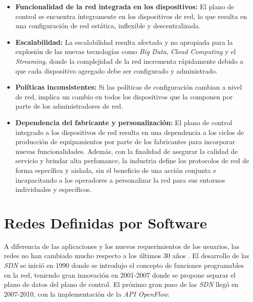 \begin{itemize}
	\item \textbf{Funcionalidad de la red integrada en los dispositivos:} El plano de control se encuentra íntegramente en los dispositivos de red, lo que resulta en una configuración de red estática, inflexible y descentralizada. 
	\item \textbf{Escalabilidad:} La escalabilidad resulta afectada y no apropiada para la explosión de las nuevas tecnologías como \textit{Big Data}, \textit{Cloud Computing} y el \textit{Streaming}, donde la complejidad de la red incrementa rápidamente debido a que cada dispositivo agregado debe ser configurado y administrado.
	\item \textbf{Políticas inconsistentes:} Si las políticas de configuración cambian a nivel de red, implica un cambio en todos los dispositivos que la componen por parte de los administradores de red.
	\item \textbf{Dependencia del fabricante y personalización:} El plano de control integrado a los dispositivos de red resulta en una dependencia a los ciclos de producción de equipamientos por parte de los fabricantes para incorporar nuevas funcionalidades. Además, con la finalidad de asegurar la calidad de servicio y brindar alta perfomance, la industria define los protocolos de red de forma específica y aislada, sin el beneficio de una acción conjunta e incapacitando a los operadores a personalizar la red para sus entornos individuales y específicos. 
\end{itemize}

\section{Redes Definidas por Software} \label{sec:rsdn}

A diferencia de las aplicaciones y los nuevos requerimientos de los usuarios, las redes no han cambiado mucho respecto a los últimos 30 años \parencite{sdnroad}. El desarrollo de las \textit{SDN} se inició en 1990 donde se introdujo el concepto de funciones programables en la red, teniendo gran innovación en 2001-2007 donde se propone separar el plano de datos del plano de control. El próximo gran paso de las \textit{SDN} llegó en 2007-2010, con la implementación de la \textit{API OpenFlow}.
\\

